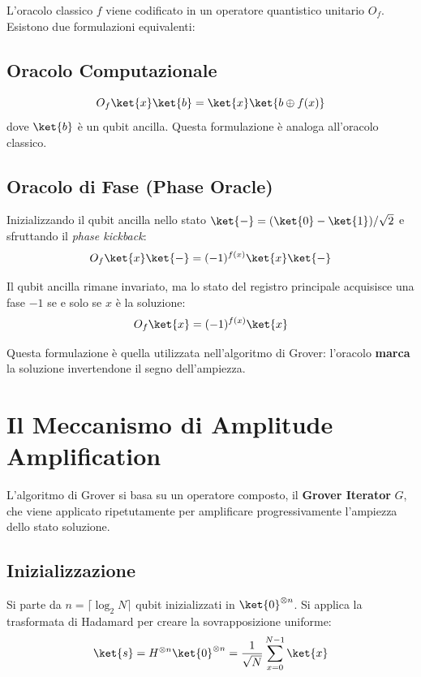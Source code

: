 \begin{onehalfspace}
L'oracolo classico $f$ viene codificato in un operatore quantistico unitario $O_f$. Esistono due formulazioni equivalenti:

\subsection{Oracolo Computazionale}
\begin{equation}
    O_f\ket{x}\ket{b} = \ket{x}\ket{b \oplus f(x)}
\end{equation}
dove $\ket{b}$ è un qubit ancilla. Questa formulazione è analoga all'oracolo classico.

\subsection{Oracolo di Fase (Phase Oracle)}
Inizializzando il qubit ancilla nello stato $\ket{-} = (\ket{0}-\ket{1})/\sqrt{2}$ e sfruttando il \textit{phase kickback}:
\begin{equation}
    O_f\ket{x}\ket{-} = (-1)^{f(x)}\ket{x}\ket{-}
\end{equation}

Il qubit ancilla rimane invariato, ma lo stato del registro principale acquisisce una fase $-1$ se e solo se $x$ è la soluzione:
\begin{equation}
    O_f\ket{x} = (-1)^{f(x)}\ket{x}
\end{equation}

Questa formulazione è quella utilizzata nell'algoritmo di Grover: l'oracolo \textbf{marca} la soluzione invertendone il segno dell'ampiezza.

\section{Il Meccanismo di Amplitude Amplification}

L'algoritmo di Grover si basa su un operatore composto, il \textbf{Grover Iterator} $G$, che viene applicato ripetutamente per amplificare progressivamente l'ampiezza dello stato soluzione.

\subsection{Inizializzazione}

Si parte da $n = \lceil \log_2 N \rceil$ qubit inizializzati in $\ket{0}^{\otimes n}$. Si applica la trasformata di Hadamard per creare la sovrapposizione uniforme:
\begin{equation}
    \ket{s} = H^{\otimes n}\ket{0}^{\otimes n} = \frac{1}{\sqrt{N}}\sum_{x=0}^{N-1}\ket{x}
\end{equation}


\end{onehalfspace}
